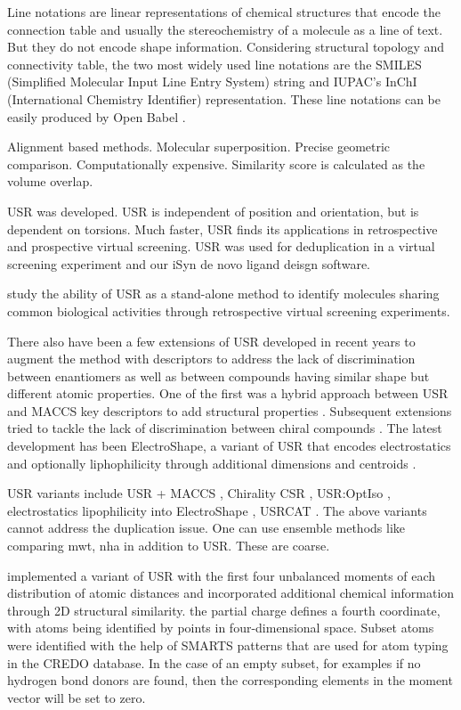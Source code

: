 \documentclass[twocolumn]{svjour3}          %
\begin{document}
Line notations are linear representations of chemical structures that encode the connection table and usually the stereochemistry of a molecule as a line of text. But they do not encode shape information. Considering structural topology and connectivity table, the two most widely used line notations are the SMILES (Simplified Molecular Input Line Entry System) string \cite{} and IUPAC’s InChI (International Chemistry Identifier) representation. These line notations can be easily produced by Open Babel \cite{968}.

Alignment based methods. Molecular superposition. Precise geometric comparison. Computationally expensive. Similarity score is calculated as the volume overlap.

USR \cite{1379,1280} was developed. USR is independent of position and orientation, but is dependent on torsions. Much faster, USR finds its applications in retrospective \cite{1332} and prospective \cite{1380} virtual screening. USR was used for deduplication in a virtual screening experiment \cite{1390} and our iSyn \cite{1381,1387} de novo ligand deisgn software.

\cite{1332} study the ability of USR as a stand-alone method to identify molecules sharing common biological activities through retrospective virtual screening experiments.

There also have been a few extensions of USR developed in recent years to augment the method with descriptors to address the lack of discrimination between enantiomers as well as between compounds having similar shape but different atomic properties. One of the first was a hybrid approach between USR and MACCS key descriptors to add structural properties \cite{1333}. Subsequent extensions tried to tackle the lack of discrimination between chiral compounds \cite{1334,1335}. The latest development has been ElectroShape, a variant of USR that encodes electrostatics and optionally liphophilicity through additional dimensions and centroids \cite{1337,1338}.

USR variants include USR + MACCS \cite{1333}, Chirality CSR \cite{1334}, USR:OptIso \cite{1335}, electrostatics \cite{1337} lipophilicity into ElectroShape \cite{1338}, USRCAT \cite{1331}. The above variants cannot address the duplication issue. One can use ensemble methods like comparing mwt, nha in addition to USR. These are coarse.

\cite{1333} implemented a variant of USR with the first four unbalanced moments of each distribution of atomic distances and incorporated additional chemical information through 2D structural similarity.
\cite{1337} the partial charge defines a fourth coordinate, with atoms being identified by points in four-dimensional space.
\cite{1331} Subset atoms were identified with the help of SMARTS patterns that are used for atom typing in the CREDO database. In the case of an empty subset, for examples if no hydrogen bond donors are found, then the corresponding elements in the moment vector will be set to zero.
\end{document}
